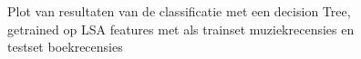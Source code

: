 \begin{figure}%
    \centering
    \label{fig:example}%
    \caption{Plot van resultaten van de classificatie met een decision Tree, getrained op LSA features met als trainset muziekrecensies en testset boekrecensies}
\end{figure}
%  

